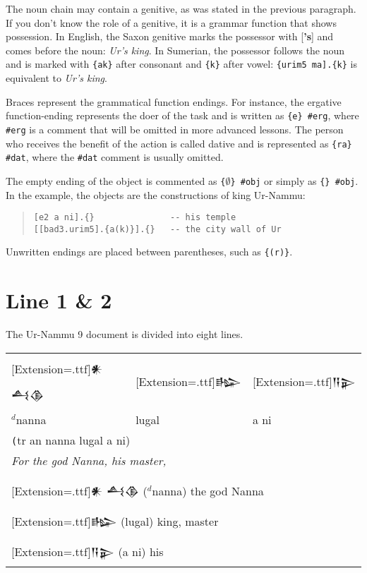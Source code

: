 \documentclass[a4paper,12pt]{book}
\newcommand{\fcn}{\setmainfont{Akkadian}[Extension=.ttf]}
\begin{document}
The noun chain may contain a genitive, as was
stated in the previous paragraph. If you don't
know the role of a genitive, it is a grammar
function that shows possession. In English,
the Saxon genitive marks the possessor with
[{\bf 's}] and comes before the noun:
{\em Ur's king}. In Sumerian, the possessor
follows the noun and is marked with \verb|{ak}|
after consonant and \verb|{k}| after vowel:
\verb|{urim5 ma].{k}| is equivalent
to {\em Ur's king}.

Braces represent the grammatical function endings.
For instance, the ergative function-ending
represents the doer of the task and is written
as \verb|{e} #erg|, where \verb|#erg| is a comment
that will be omitted in more advanced lessons.
The person who receives the benefit of the
action is called dative and is represented
as \verb|{ra} #dat|, where the \verb|#dat|
comment is usually omitted.

The empty ending of the object is commented
as \verb|{|$\emptyset$\verb|} #obj| or simply as \verb|{} #obj|.
In the example, the objects are the constructions
of king Ur-Nammu:
\begin{quote}
\begin{verbatim}
[e2 a ni].{}               -- his temple
[[bad3.urim5].{a(k)}].{}   -- the city wall of Ur
\end{verbatim}
\end{quote}
Unwritten endings are placed between parentheses,
such as \verb|{(r)}|.

\section{Line 1 \& 2}
The Ur-Nammu 9 document is divided into eight lines.\\

\begin{tabular}[!h]{l l l}
\fcn\Large 𒀭 𒋀𒆠
&\fcn\Large 𒈗 &\fcn\Large 𒀀𒉌\\
  $^d$nanna & lugal & a ni\\
\multicolumn{3}{l}{\texttt (tr an nanna lugal a ni)}\\
\multicolumn{3}{l}{\em For the god Nanna, his master,}\\
\hline\\
\multicolumn{3}{l}{{\fcn 𒀭 𒋀𒆠}
                    ($^d$nanna) the god Nanna }\\
\multicolumn{3}{l}{{\fcn 𒈗}
                    (lugal) king, master }\\
\multicolumn{3}{l}{{\fcn 𒀀𒉌}
                    (a ni) his }\\
\end{tabular}
\end{document}
